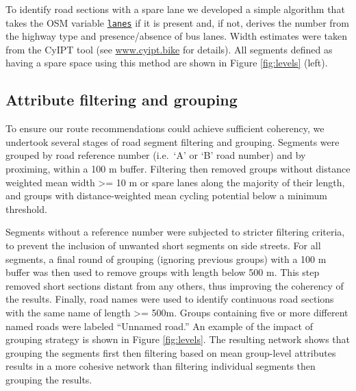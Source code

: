 \documentclass[
]{article}
\begin{document}
To identify road sections with a spare lane we developed a simple algorithm that takes the OSM variable \href{https://wiki.openstreetmap.org/wiki/Key:lanes}{\texttt{lanes}} if it is present and, if not, derives the number from the highway type and presence/absence of bus lanes.
Width estimates were taken from the CyIPT tool (see \href{https://www.cyipt.bike/}{www.cyipt.bike} for details).
All segments defined as having a spare space using this method are shown in Figure \ref{fig:levels} (left).

\hypertarget{attribute-filtering-and-grouping}{%
\subsection{Attribute filtering and grouping}\label{attribute-filtering-and-grouping}}

To ensure our route recommendations could achieve sufficient coherency, we undertook several stages of road segment filtering and grouping.
Segments were grouped by road reference number (i.e.~`A' or `B' road number) and by proximing, within a 100 m buffer.
Filtering then removed groups without distance weighted mean width \textgreater= 10 m or spare lanes along the majority of their length, and groups with distance-weighted mean cycling potential below a minimum threshold.

Segments without a reference number were subjected to stricter filtering criteria, to prevent the inclusion of unwanted short segments on side streets.
For all segments, a final round of grouping (ignoring previous groups) with a 100 m buffer was then used to remove groups with length below 500 m.
This step removed short sections distant from any others, thus improving the coherency of the results.
Finally, road names were used to identify continuous road sections with the same name of length \textgreater= 500m.
Groups containing five or more different named roads were labeled ``Unnamed road.''
An example of the impact of grouping strategy is shown in Figure \ref{fig:levels}.
The resulting network shows that grouping the segments first then filtering based on mean group-level attributes results in a more cohesive network than filtering individual segments then grouping the results.
\end{document}
